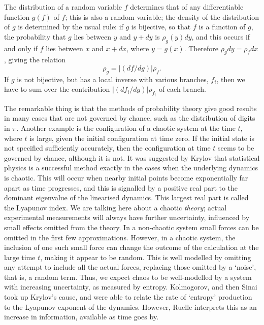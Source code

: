 The distribution of a random variable $f$ determines that of any
differentiable function $g(f)$ of $f$; this is also a random variable;
the density of the distribution of $g$ is determined by the usual rule:
if $g$ is bijective, so that $f$ is a function of $g$,
the probability that $g$ lies between $y$ and $y+dy$
is $\rho_g(y)dy$, and this occurs if and only if $f$ lies between $x$
and $x+dx$, where $y=g(x)$. Therefore $\rho_gdy=\rho_fdx$, giving the
relation
\begin{equation}
\rho_g=|(df/dg)|\rho_f.
\label{change}
\end{equation}
If $g$ is not bijective, but has a local inverse with various branches,
$f_i$, then we have to sum over the contribution $|(df_i/dg)|\rho_{f_i}$
of each branch.


The remarkable thing is that the methods of probability theory give good
results in many cases that are not governed by chance, such as the
distribution of digits in $\pi$. Another example is the
configuration of a chaotic system at the time $t$, where $t$ is large,
given the initial configuration at time zero. If the initial
state is not specified sufficiently accurately, then the configuration at
time $t$ seems to be governed by chance, although it is not.
It was suggested by Krylov \cite{Krylov} that statistical physics is a
successful method exactly in the cases when the underlying
dynamics is chaotic. This will occur when nearby initial points
become exponentially far apart as time progresses, and this is signalled by
a positive
real part to the dominant eigenvalue of the linearised dynamics.
This largest real part is called the Lyapunov index.
We are talking here about a chaotic {\em theory};
actual experimental measurements will always have further uncertainty,
influenced by small
effects omitted from the theory. In a non-chaotic system small
forces can be omitted in the first few approximations. However, in a
chaotic system, the inclusion of one such small force can change the
outcome of the calculation at the large time $t$, making it appear to
be random. This is well modelled by omitting any attempt to include all
the actual forces, replacing those omitted by a `noise', that is, a
random term. Thus, we expect chaos to be well-modelled by a system with
increasing uncertainty, as measured by entropy. Kolmogorov, and then
Sinai took up Krylov's cause, and were able to relate the rate of
`entropy' production to the Lyapunov exponent of the dynamics.
However, Ruelle interprets this 
\cite{Ruelle} as an increase in information, available as time goes by.



